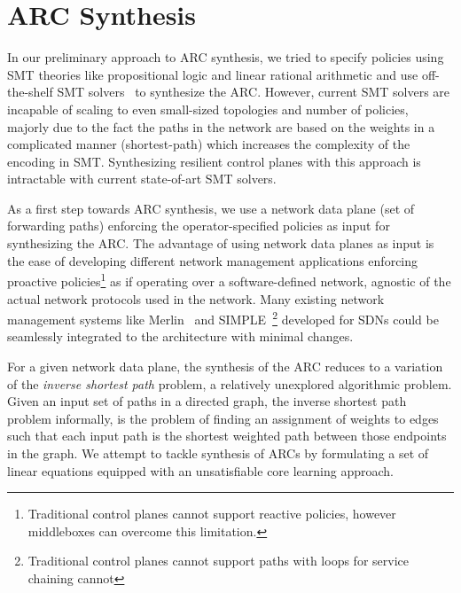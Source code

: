 \section{ARC Synthesis}

In our preliminary approach to ARC synthesis, 
we tried to specify policies using SMT theories like propositional logic and 
linear rational arithmetic and use off-the-shelf SMT solvers~\cite{z3} 
to synthesize the ARC. However, current SMT solvers are incapable of 
scaling to even small-sized topologies and number of policies, majorly
due to the fact the paths in the network are based on the weights in a 
complicated manner (shortest-path) which increases the complexity of the
encoding in SMT. Synthesizing resilient control planes with this 
approach is intractable with current state-of-art SMT solvers.

As a first step towards ARC synthesis, 
we use a network data plane (set of forwarding paths)
enforcing the operator-specified policies 
as input for synthesizing the ARC. The  
advantage of using network data planes as 
input is the ease of developing
different network management applications 
enforcing proactive policies\footnote{
Traditional control planes cannot support reactive policies, however
middleboxes can overcome this limitation.} 
as if operating over a software-defined
network, agnostic of the actual network protocols used in the network. 
Many existing network management systems like Merlin~\cite{merlin} 
and SIMPLE~\cite{simple}\footnote{
Traditional control planes cannot support 
paths with loops for service chaining cannot} developed for SDNs could be seamlessly
integrated to the architecture with minimal changes.  

For a given network data plane, the synthesis of the ARC reduces to a
variation of the {\em inverse shortest path} problem, a relatively 
unexplored algorithmic problem. 
Given an input set of paths in a directed graph, the inverse shortest path problem 
informally, is the problem of finding an assignment of weights to edges 
such that each input path is the shortest weighted path between those endpoints in 
the graph. We attempt to tackle synthesis of ARCs by formulating a set of linear
equations  equipped with an unsatisfiable core learning approach. 

